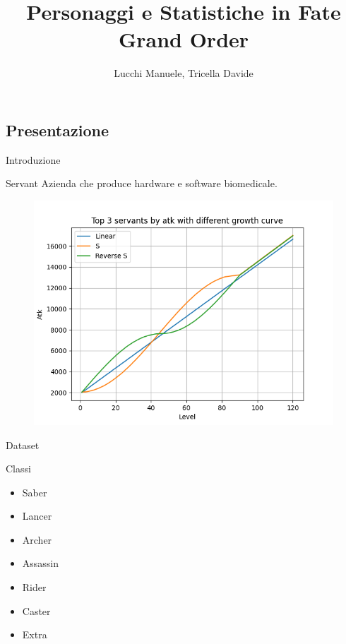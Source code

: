 \documentclass{beamer}
\title{Personaggi e Statistiche in Fate Grand Order} %
\author{Lucchi Manuele, Tricella Davide}
\begin{document}
\frame[c]{\maketitle}

\begin{darkframes}

  \section{Presentazione}

  \begin{frame}{Introduzione}

    \begin{block}{Servant}
      Azienda che produce hardware e software biomedicale.
    \end{block}

    \begin{figure}
      \centering
      \hspace{-1cm}
      \includegraphics[scale=0.325]{./images/growth.png}
    \end{figure}

  \end{frame}

  \begin{frame}{Dataset}


  \end{frame}

  \begin{frame}{Classi}
    \begin{itemize}
      \item Saber
      \item Lancer
      \item Archer
      \item Assassin
      \item Rider
      \item Caster
      \item Extra
    \end{itemize}
  \end{frame}


\end{darkframes}
\end{document}
